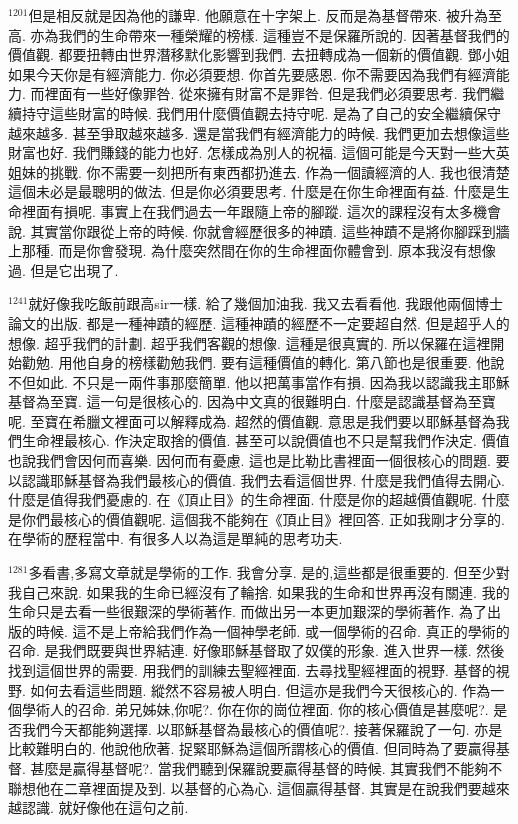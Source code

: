 \documentclass{book}
\begin{document}
$^{1201}$但是相反就是因為他的謙卑.
他願意在十字架上.
反而是為基督帶來.
被升為至高.
亦為我們的生命帶來一種榮耀的榜樣.
這種豈不是保羅所說的.
因著基督我們的價值觀.
都要扭轉由世界潛移默化影響到我們.
去扭轉成為一個新的價值觀.
鄧小姐如果今天你是有經濟能力.
你必須要想.
你首先要感恩.
你不需要因為我們有經濟能力.
而裡面有一些好像罪咎.
從來擁有財富不是罪咎.
但是我們必須要思考.
我們繼續持守這些財富的時候.
我們用什麼價值觀去持守呢.
是為了自己的安全繼續保守越來越多.
甚至爭取越來越多.
還是當我們有經濟能力的時候.
我們更加去想像這些財富也好.
我們賺錢的能力也好.
怎樣成為別人的祝福.
這個可能是今天對一些大英姐妹的挑戰.
你不需要一刻把所有東西都扔進去.
作為一個讀經濟的人.
我也很清楚這個未必是最聰明的做法.
但是你必須要思考.
什麼是在你生命裡面有益.
什麼是生命裡面有損呢.
事實上在我們過去一年跟隨上帝的腳蹤.
這次的課程沒有太多機會說.
其實當你跟從上帝的時候.
你就會經歷很多的神蹟.
這些神蹟不是將你腳踩到牆上那種.
而是你會發現.
為什麼突然間在你的生命裡面你體會到.
原本我沒有想像過.
但是它出現了.

$^{1241}$就好像我吃飯前跟高sir一樣.
給了幾個加油我.
我又去看看他.
我跟他兩個博士論文的出版.
都是一種神蹟的經歷.
這種神蹟的經歷不一定要超自然.
但是超乎人的想像.
超乎我們的計劃.
超乎我們客觀的想像.
這種是很真實的.
所以保羅在這裡開始勸勉.
用他自身的榜樣勸勉我們.
要有這種價值的轉化.
第八節也是很重要.
他說不但如此.
不只是一兩件事那麼簡單.
他以把萬事當作有損.
因為我以認識我主耶穌基督為至寶.
這一句是很核心的.
因為中文真的很難明白.
什麼是認識基督為至寶呢.
至寶在希臘文裡面可以解釋成為.
超然的價值觀.
意思是我們要以耶穌基督為我們生命裡最核心.
作決定取捨的價值.
甚至可以說價值也不只是幫我們作決定.
價值也說我們會因何而喜樂.
因何而有憂慮.
這也是比勒比書裡面一個很核心的問題.
要以認識耶穌基督為我們最核心的價值.
我們去看這個世界.
什麼是我們值得去開心.
什麼是值得我們憂慮的.
在《頂止目》的生命裡面.
什麼是你的超越價值觀呢.
什麼是你們最核心的價值觀呢.
這個我不能夠在《頂止目》裡回答.
正如我剛才分享的.
在學術的歷程當中.
有很多人以為這是單純的思考功夫.

$^{1281}$多看書,多寫文章就是學術的工作.
我會分享.
是的,這些都是很重要的.
但至少對我自己來說.
如果我的生命已經沒有了輪捨.
如果我的生命和世界再沒有關連.
我的生命只是去看一些很艱深的學術著作.
而做出另一本更加艱深的學術著作.
為了出版的時候.
這不是上帝給我們作為一個神學老師.
或一個學術的召命.
真正的學術的召命.
是我們既要與世界結連.
好像耶穌基督取了奴僕的形象.
進入世界一樣.
然後找到這個世界的需要.
用我們的訓練去聖經裡面.
去尋找聖經裡面的視野.
基督的視野.
如何去看這些問題.
縱然不容易被人明白.
但這亦是我們今天很核心的.
作為一個學術人的召命.
弟兄姊妹,你呢?.
你在你的崗位裡面.
你的核心價值是甚麼呢?.
是否我們今天都能夠選擇.
以耶穌基督為最核心的價值呢?.
接著保羅說了一句.
亦是比較難明白的.
他說他欣著.
捉緊耶穌為這個所謂核心的價值.
但同時為了要贏得基督.
甚麼是贏得基督呢?.
當我們聽到保羅說要贏得基督的時候.
其實我們不能夠不聯想他在二章裡面提及到.
以基督的心為心.
這個贏得基督.
其實是在說我們要越來越認識.
就好像他在這句之前.
\end{document}
